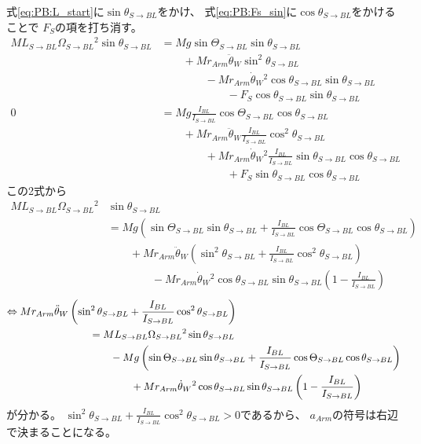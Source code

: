 \documentclass[a4paper,11pt]{jsarticle}
\begin{document}
式\ref{eq:PB:L_start}に$\sin\theta_{S\rightarrow BL}$をかけ、
式\ref{eq:PB:Fs_sin}に$\cos\theta_{S\rightarrow BL}$をかけることで
$F_S$の項を打ち消す。
\begin{align*}
  ML_{S\rightarrow BL}\Omega_{S\rightarrow BL}{}^2 \sin\theta_{S\rightarrow BL} 
  &= Mg\sin\Theta_{S\rightarrow BL} \sin\theta_{S\rightarrow BL}
  \\
  & \qquad + Mr_{Arm}\ddot{\theta}_W\sin^2\theta_{S\rightarrow BL}
  \\
  & \qquad \qquad - Mr_{Arm}\dot{\theta}_W{}^2\cos\theta_{S\rightarrow BL} \sin\theta_{S\rightarrow BL}
  \\
  & \qquad \qquad \qquad - F_S\cos\theta_{S\rightarrow BL}\sin\theta_{S\rightarrow BL}
  \\
  0
  &=  Mg\frac{I_{BL}}{I_{S\rightarrow BL}}\cos\Theta_{S\rightarrow BL}\cos\theta_{S\rightarrow BL}
  \\
  & \qquad + Mr_{Arm}\ddot{\theta}_W \frac{I_{BL}}{I_{S\rightarrow BL}}\cos^2\theta_{S\rightarrow BL}
  \\
  & \qquad \qquad + Mr_{Arm}\dot{\theta}_W{}^2 \frac{I_{BL}}{I_{S\rightarrow BL}}\sin\theta_{S\rightarrow BL}\cos\theta_{S\rightarrow BL}
  \\
  & \qquad \qquad \qquad + F_S\sin\theta_{S\rightarrow BL}\cos\theta_{S\rightarrow BL}
\end{align*}
この2式から
\begin{align*}
  ML_{S\rightarrow BL}\Omega_{S\rightarrow BL}{}^2 & \sin\theta_{S\rightarrow BL}
  \\
  & = Mg\left( \sin\Theta_{S\rightarrow BL} \sin\theta_{S\rightarrow BL} + \frac{I_{BL}}{I_{S\rightarrow BL}}\cos\Theta_{S\rightarrow BL} \cos\theta_{S\rightarrow BL} \right)
  \\
  & \qquad + Mr_{Arm}\ddot{\theta}_W\left( \sin^2\theta_{S\rightarrow BL} + \frac{I_{BL}}{I_{S\rightarrow BL}}\cos^2\theta_{S\rightarrow BL} \right)
  \\
  & \qquad \qquad - Mr_{Arm}\dot{\theta}_W{}^2\cos\theta_{S\rightarrow BL} \sin\theta_{S\rightarrow BL}\left( 1 - \frac{I_{BL}}{I_{S\rightarrow BL}} \right)
\end{align*}
\begin{align}
  \Leftrightarrow
  Mr_{Arm}\ddot{\theta}_W
  &\left( \sin^2\theta_{S\rightarrow BL} 
  + \frac{I_{BL}}{I_{S\rightarrow BL}}\cos^2\theta_{S\rightarrow BL} \right)
  \notag
  \\
  & \qquad = ML_{S\rightarrow BL}\Omega_{S\rightarrow BL}{}^2 \sin\theta_{S\rightarrow BL}
  \notag
  \\
  & \qquad \qquad - Mg\left( \sin\Theta_{S\rightarrow BL} \sin\theta_{S\rightarrow BL} + \frac{I_{BL}}{I_{S\rightarrow BL}}\cos\Theta_{S\rightarrow BL} \cos\theta_{S\rightarrow BL} \right)
  \notag
  \\
  & \qquad \qquad \qquad + Mr_{Arm}\dot{\theta}_W{}^2\cos\theta_{S\rightarrow BL} \sin\theta_{S\rightarrow BL}\left( 1 - \frac{I_{BL}}{I_{S\rightarrow BL}} \right)
  \label{eq:PB:a_arm_end}
\end{align}
が分かる。
$\sin^2\theta_{S\rightarrow BL} + \frac{I_{BL}}{I_{S\rightarrow BL}}\cos^2\theta_{S\rightarrow BL} > 0$であるから、
$a_{Arm}$の符号は右辺で決まることになる。
\end{document}
